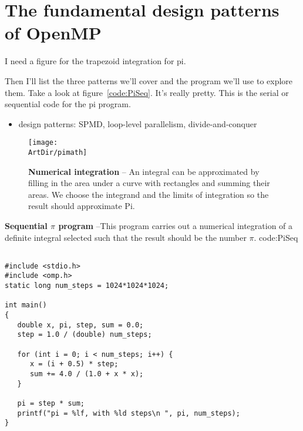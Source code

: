 

\section{The fundamental design patterns of OpenMP}
\label{sec:OMPpatterns}

I need a figure for the trapezoid integration for pi.

Then I'll list the three patterns we'll cover and the program we'll use to explore them.  
Take a look at figure~\ref{code:PiSeq}.  It's really pretty.  This is the serial or sequential code for the pi
program. 



\begin{itemize}
\item design patterns: SPMD, loop-level parallelism, divide-and-conquer
\end{itemize}


\begin{figure}[!htbp]
\texttt{[image: \\ArtDir/pimath]}
\centering
\caption
{\textbf{Numerical integration} -- \small 
An integral can be approximated by filling in 
the area under a curve with rectangles and summing their areas.  We choose
the integrand and the limits of integration so the result should approximate Pi.
}
\label{pimath}
\end{figure}




\begin{CodeExample}%
{\textbf{Sequential $\pi$ program} --\small This program carries out a numerical integration 
of a definite integral selected such that the result should be the number $\pi$.
}%
{code:PiSeq}
\begin{lstlisting}

#include <stdio.h>
#include <omp.h>
static long num_steps = 1024*1024*1024;

int main()
{
   double x, pi, step, sum = 0.0;
   step = 1.0 / (double) num_steps;

   for (int i = 0; i < num_steps; i++) {
      x = (i + 0.5) * step;
      sum += 4.0 / (1.0 + x * x);
   }

   pi = step * sum;
   printf("pi = %lf, with %ld steps\n ", pi, num_steps);
}
\end{lstlisting}
\end{CodeExample}


